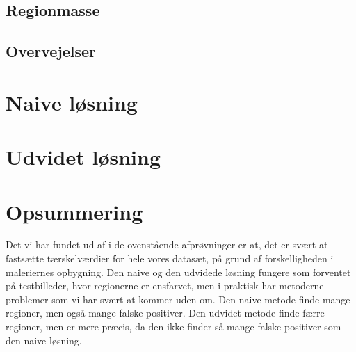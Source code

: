 {\subsection{Regionmasse}


\subsection{Overvejelser}


\section{Naive løsning}

\clearpage

\section{Udvidet løsning}

\clearpage

\section{Opsummering}
Det vi har fundet ud af i de ovenstående afprøvninger er at, det er
svært at fastsætte tærskelværdier for hele vores datasæt, på
grund af forskelligheden i maleriernes opbygning. Den naive og den
udvidede løsning fungere som forventet på testbilleder,
hvor regionerne er ensfarvet, men i praktisk har metoderne problemer som
vi har svært at kommer uden om. Den naive metode finde mange regioner,
men også mange falske positiver. Den udvidet metode finde færre
regioner, men er mere præcis, da den ikke finder så mange falske
positiver som den naive løsning.

}

